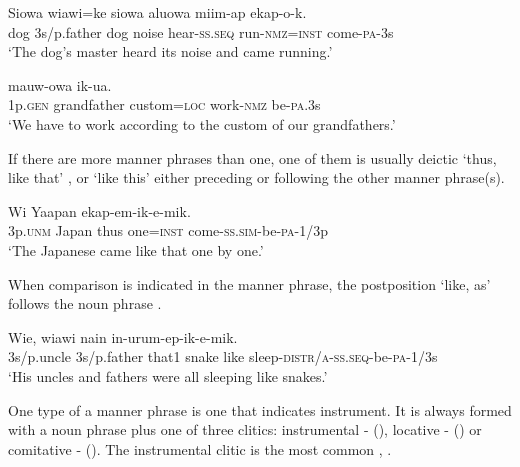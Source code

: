 \ea%
\label{ex:4:x882}
\gll Siowa  wiawi=ke  siowa  aluowa  miim-ap   ekap-o-k.\\
  dog  3s/p.father  dog  noise  hear-\textsc{ss}.\textsc{seq}  run-\textsc{nmz}=\textsc{inst}  come-\textsc{pa}-3s    \\
\glt`The dog's master heard its noise and came running.'
\z

\ea%
\label{ex:4:x884}
\gll {}    mauw-owa  ik-ua. \\
 1p.\textsc{gen}  grandfather  custom=\textsc{loc}  work-\textsc{nmz}  be-\textsc{pa}.3s     \\
\glt`We have to work according to the custom of our grandfathers.'
\z

If there are more manner phrases than one, one of them is usually deictic  `thus, like that' , or  `like this' either preceding or following the other manner phrase(s).

\ea%
\label{ex:4:x883}
\gll Wi  Yaapan     ekap-em-ik-e-mik. \\
  3p.\textsc{unm}  Japan  thus  one=\textsc{inst}  come-\textsc{ss}.\textsc{sim}-be-\textsc{pa}-1/3p    \\
\glt`The Japanese came like that one by one.'
\z

When comparison is indicated in the manner phrase, the postposition  `like, as' follows the noun phrase .

\ea%
\label{ex:4:x885}
\gll Wie,  wiawi  nain    in-urum-ep-ik-e-mik.\\
  3s/p.uncle  3s/p.father  that1  snake  like  sleep-\textsc{distr}/\textsc{a}-\textsc{ss}.\textsc{seq}-be-\textsc{pa}-1/3s    \\
\glt`His uncles and fathers were all sleeping like snakes.'
\z

One type of a manner phrase is one that indicates instrument.  It is always formed with a noun phrase plus one of three clitics: instrumental -\textstyleStyleVernacularWordsItalic{} (), locative -  ()\textstyleStyleVernacularWordsItalic{} or comitative -\textstyleStyleVernacularWordsItalic{} (). The instrumental clitic is the most common , . 

